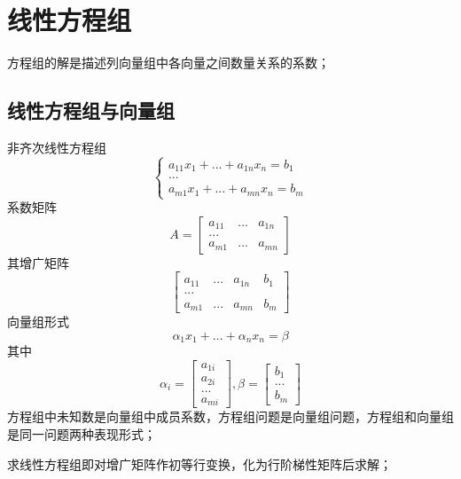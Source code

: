 
\chapter{线性方程组}

方程组的解是描述列向量组中各向量之间数量关系的系数；

\section{线性方程组与向量组}

非齐次线性方程组\[\begin{cases}
    a_{11}x_1 + ... + a_{1n}x_n = b_1 \\ 
    ... \\ 
    a_{m1}x_1 + ... + a_{mn}x_n = b_m
\end{cases}\]
系数矩阵\[A = \begin{bmatrix}
    a_{11} & ... & a_{1n} \\ 
    ... \\ 
    a_{m1} & ... & a_{mn}
\end{bmatrix}\]
其增广矩阵\[\begin{bmatrix}
    a_{11} & ... & a_{1n} & b_1 \\ 
    ... \\ 
    a_{m1} & ... & a_{mn} & b_m
\end{bmatrix}\]
向量组形式
\[\alpha_1x_1 + ... + \alpha_nx_n = \beta\]
其中\[\alpha_i = \begin{bmatrix}
    a_{1i} \\ 
    a_{2i} \\
    ... \\ 
    a_{mi}
\end{bmatrix}, \beta = \begin{bmatrix}
    b_1 \\ 
    ... \\ 
    b_m
\end{bmatrix}\]
方程组中未知数是向量组中成员系数，方程组问题是向量组问题，方程组和向量组是同一问题两种表现形式；

求线性方程组即对增广矩阵作初等行变换，化为行阶梯性矩阵后求解；


